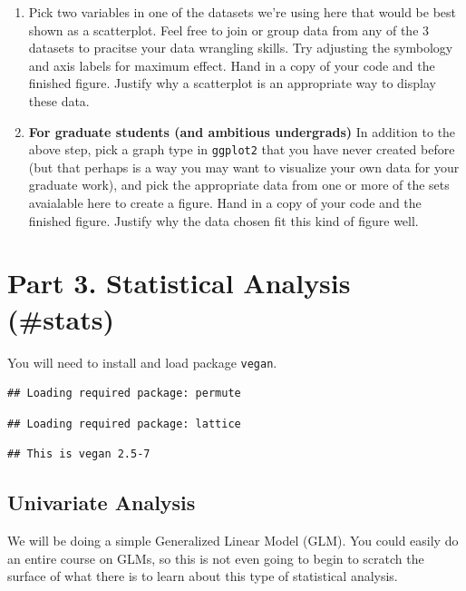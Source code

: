 \documentclass[
]{book}
\begin{document}
\begin{enumerate}
\def\labelenumi{\arabic{enumi}.}
\item
  Pick two variables in one of the datasets we're using here that would be best shown as a scatterplot. Feel free to join or group data from any of the 3 datasets to pracitse your data wrangling skills. Try adjusting the symbology and axis labels for maximum effect. Hand in a copy of your code and the finished figure. Justify why a scatterplot is an appropriate way to display these data.
\item
  \textbf{For graduate students (and ambitious undergrads)} In addition to the above step, pick a graph type in \texttt{ggplot2} that you have never created before (but that perhaps is a way you may want to visualize your own data for your graduate work), and pick the appropriate data from one or more of the sets avaialable here to create a figure. Hand in a copy of your code and the finished figure. Justify why the data chosen fit this kind of figure well.
\end{enumerate}

\hypertarget{part-3.-statistical-analysis-stats}{%
\chapter{Part 3. Statistical Analysis (\#stats)}\label{part-3.-statistical-analysis-stats}}

You will need to install and load package \texttt{vegan}.

\begin{verbatim}
## Loading required package: permute
\end{verbatim}

\begin{verbatim}
## Loading required package: lattice
\end{verbatim}

\begin{verbatim}
## This is vegan 2.5-7
\end{verbatim}

\hypertarget{univariate-analysis}{%
\section{Univariate Analysis}\label{univariate-analysis}}

We will be doing a simple Generalized Linear Model (GLM). You could easily do an entire course on GLMs, so this is not even going to begin to scratch the surface of what there is to learn about this type of statistical analysis.
\end{document}

